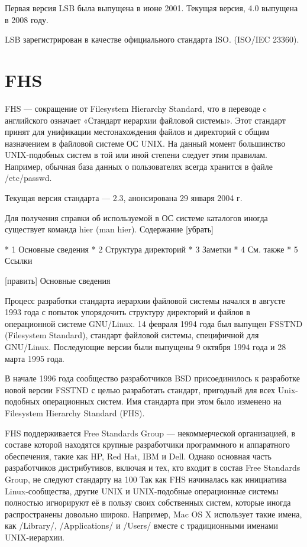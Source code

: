 Первая версия LSB была выпущена в июне 2001. Текущая версия, 4.0 выпущена в 2008 году.

LSB зарегистрирован в качестве официального стандарта ISO. (ISO/IEC 23360).
\section {FHS}
FHS — сокращение от Filesystem Hierarchy Standard, что в переводе c английского означает «Стандарт иерархии файловой системы». Этот стандарт принят для унификации местонахождения файлов и директорий с общим назначением в файловой системе ОС UNIX. На данный момент большинство UNIX-подобных систем в той или иной степени следует этим правилам. Например, обычная база данных о пользователях всегда хранится в файле /etc/passwd.

Текущая версия стандарта — 2.3, анонсирована 29 января 2004 г.

Для получения справки об используемой в ОС системе каталогов иногда существует команда hier (man hier).
Содержание
[убрать]

    * 1 Основные сведения
    * 2 Структура директорий
    * 3 Заметки
    * 4 См. также
    * 5 Ссылки

[править] Основные сведения

Процесс разработки стандарта иерархии файловой системы начался в августе 1993 года с попыток упорядочить структуру директорий и файлов в операционной системе GNU/Linux. 14 февраля 1994 года был выпущен FSSTND (Filesystem Standard), стандарт файловой системы, специфичной для GNU/Linux. Последующие версии были выпущены 9 октября 1994 года и 28 марта 1995 года.

В начале 1996 года сообщество разработчиков BSD присоединилось к разработке новой версии FSSTND с целью разработать стандарт, пригодный для всех Unix-подобных операционных систем. Имя стандарта при этом было изменено на Filesystem Hierarchy Standard (FHS).

FHS поддерживается Free Standards Group — некоммерческой организацией, в составе которой находятся крупные разработчики программного и аппаратного обеспечения, такие как HP, Red Hat, IBM и Dell. Однако основная часть разработчиков дистрибутивов, включая и тех, кто входит в состав Free Standards Group, не следуют стандарту на 100 %
Так как FHS начиналась как инициатива Linux-сообщества, другие UNIX и UNIX-подобные операционные системы полностью игнорируют её в пользу своих собственных систем, которые иногда распространены довольно широко. Например, Mac OS X использует такие имена, как /Library/, /Applications/ и /Users/ вместе с традиционными именами UNIX-иерархии.
